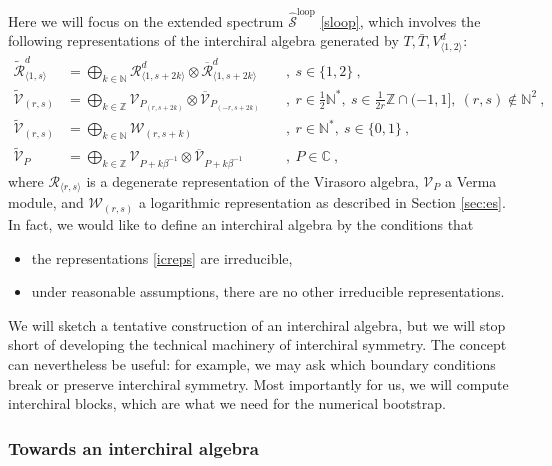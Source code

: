 \documentclass[12pt, a4paper]{article}
\begin{document}
Here we will focus on the extended spectrum $\widehat{\mathcal{S}}^\text{loop}$ \eqref{sloop}, which involves the following representations of the interchiral algebra generated by $T,\bar T,V^d_{\langle 1,2\rangle}$:
\begin{subequations}
\label{icreps}
 \begin{alignat}{2}
 \widetilde{\mathcal{R}}^d_{\langle 1,s\rangle} &= \bigoplus_{k\in \mathbb{N}} \mathcal{R}^d_{\langle 1,s+2k \rangle} \otimes \overline{\mathcal{R}}^d_{\langle 1, s+2k\rangle} 
 && \ , \ s\in \{1, 2\}\ , 
 \label{wrd}
 \\
  \widetilde{\mathcal{V}}_{(r,s)} &= \bigoplus_{k\in\mathbb{Z}} \mathcal{V}_{P_{(r,s+2k)}}\otimes \overline{\mathcal{V}}_{P_{(-r,s+2k)}} && \ , \  r\in \tfrac12\mathbb{N}^*,\ s\in \tfrac{1}{2r}\mathbb{Z}\cap (-1, 1],\ (r,s)\notin \mathbb{N}^2\ , 
 \label{wvrs}
 \\
 \widetilde{\mathcal{V}}_{(r,s)} &= \bigoplus_{k\in \mathbb{N}} \mathcal{W}_{(r, s+k)} && \ , \ r\in \mathbb{N}^*,\ s\in \{0,1\}\ , 
 \label{wlog}
 \\
   \widetilde{\mathcal{V}}_P &= \bigoplus_{k\in\mathbb{Z}} \mathcal{V}_{P+k\beta^{-1}}\otimes \overline{\mathcal{V}}_{P+k\beta^{-1}} && \ , \ P\in \mathbb{C}\ ,
 \label{wvp}
 \end{alignat}
\end{subequations}
where $\mathcal{R}_{\langle r,s\rangle}$ is a degenerate representation of the Virasoro algebra, $\mathcal{V}_P$ a Verma module, and $\mathcal{W}_{(r,s)}$ a logarithmic representation as described in Section \ref{sec:es}. In fact, we would like to define an interchiral algebra by the conditions that 
\begin{itemize}
 \item the representations \eqref{icreps} are irreducible,
 \item under reasonable assumptions, there are no other irreducible representations. 
\end{itemize}
We will sketch a tentative construction of an interchiral algebra, but we will stop short of developing the technical machinery of interchiral symmetry. The concept can nevertheless be useful: for example, we may ask which boundary conditions break or preserve interchiral symmetry. Most importantly for us, we will compute interchiral blocks, which are what we need for the numerical bootstrap. 


\subsubsection{Towards an interchiral algebra}
\end{document}
